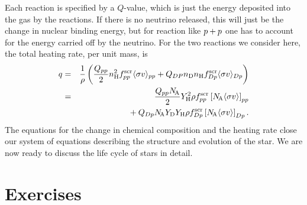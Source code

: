 Each reaction is specified by a $Q$-value, which is just the energy deposited into the gas by the reactions. If there is no neutrino released, this will just be the change in nuclear binding energy, but for reaction like $p + p$ one has to account for the energy carried off by the neutrino.  For the two reactions we consider here, the total heating rate, per unit mass, is
\begin{eqnarray}
q &=& \frac{1}{\rho}\left(\frac{Q_{pp}}{2}n_{\mathrm{H}}^{2} f^{\mathrm{scr}}_{pp}\langle\sigma v\rangle_{pp} + Q_{DP} n_{\mathrm{D}}n_{\mathrm{H}} f^{\mathrm{scr}}_{Dp}\langle\sigma v\rangle_{Dp}\right)\\
 &=& \frac{Q_{pp}N_\mathrm{\!A}}{2}Y_{\mathrm{H}}^{2}\rho f^{\mathrm{scr}}_{pp} \left[N_\mathrm{\!A}\langle\sigma v\rangle\right]_{pp} \nonumber \\
 && {}+ Q_{Dp}N_\mathrm{\!A} Y_{\mathrm{D}}Y_{\mathrm{H}} \rho f^{\mathrm{scr}}_{Dp} \left[N_\mathrm{\!A}\langle\sigma v\rangle\right]_{Dp} .
\label{e.heating-rate}
\end{eqnarray}
The equations for the change in chemical composition and the heating rate close our system of equations describing the structure and evolution of the star.  We are now ready to discuss the life cycle of stars in detail.

\section{Exercises}

